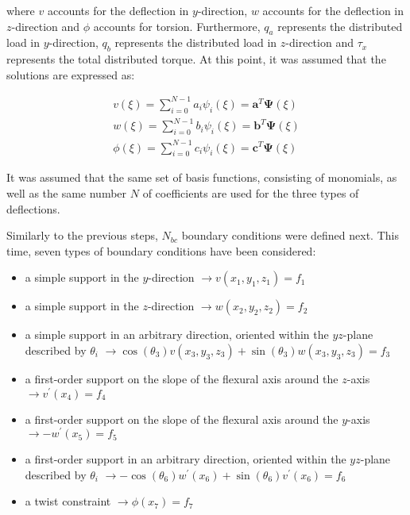 where $v$ accounts for the deflection in $y$-direction, $w$ accounts for the deflection in $z$-direction and $\phi$ accounts for torsion. Furthermore, $q_a$ represents the distributed load in $y$-direction, $q_b$ represents the distributed load in $z$-direction and $\tau_x$ represents the total distributed torque. At this point, it was assumed that the solutions are expressed as:

\begin{equation}
    \begin{array}{l}
{v(\xi)=\sum_{i=0}^{N-1} a_{i} \psi_{i}(\xi)=\mathbf{a}^{T} \mathbf{\Psi}(\xi)} \\
{w(\xi)=\sum_{i=0}^{N-1} b_{i} \psi_{i}(\xi)=\mathbf{b}^{T} \mathbf{\Psi}(\xi)} \\
{\phi(\xi)=\sum_{i=0}^{N-1} c_{i} \psi_{i}(\xi)=\mathbf{c}^{T} \mathbf{\Psi}(\xi)}
\end{array}
\end{equation}

It was assumed that the same set of basis functions, consisting of monomials, as well as the same number $N$ of coefficients are used for the three types of deflections.

Similarly to the previous steps, $N_{bc}$ boundary conditions were defined next. This time, seven types of boundary conditions have been considered:
\begin{itemize}
    \item a simple support in the $y$-direction $\rightarrow v\left(x_{1}, y_{1}, z_{1}\right)=f_{1}$
    \item a simple support in the $z$-direction $\rightarrow w\left(x_{2}, y_{2}, z_{2}\right)=f_{2}$
    \item a simple support in an arbitrary direction, oriented within the $yz$-plane described by $\theta_i$ $\rightarrow \cos \left(\theta_{3}\right) v\left(x_{3}, y_{3}, z_{3}\right)+\sin \left(\theta_{3}\right) w\left(x_{3}, y_{3}, z_{3}\right)=f_{3}$
    \item a first-order support on the slope of the flexural axis around the $z$-axis $\rightarrow v^{\prime}\left(x_{4}\right)=f_{4}$
    \item a first-order support on the slope of the flexural axis around the $y$-axis $\rightarrow -w^{\prime}\left(x_{5}\right)=f_{5}$
    \item a first-order support in an arbitrary direction, oriented within the $yz$-plane described by $\theta_i$ $\rightarrow -\cos \left(\theta_{6}\right) w^{\prime}\left(x_{6}\right)+\sin \left(\theta_{6}\right) v^{\prime}\left(x_{6}\right)=f_{6}$
    \item a twist constraint $\rightarrow \phi\left(x_{7}\right)=f_{7}$
    
\end{itemize}

